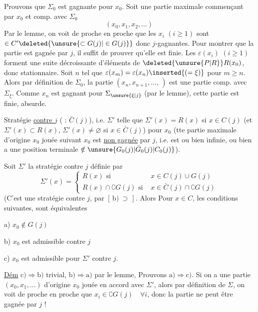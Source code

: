 Prouvons que $\Sigma_0$ est gagnante pour $x_0$. Soit une partie maximale commençant par $x_0$
et comp. avec $\Sigma_0$
\[
 (x_0,x_1,x_2,\ldots)
\]
Par le lemme, on voit de proche en proche  que   les $x_i$ $(i\geq1)$ sont $\in C'\deleted{\unsure{\subset G(j)|\in G(j)}}$ donc $j$-gagnantes. Pour montrer que la partie est gagnée par $j$, il suffit de prouver qu'elle est finie.   Les $\varepsilon(x_i)$ $(i\geq1)$ forment une suite décroissante d'éléments de $\deleted{\unsure{P|R}}R(x_0)$, donc stationnaire. Soit $n$ tel que $\varepsilon(x_m)=\varepsilon(x_n)\inserted{(=\xi)}$ pour $m\geq n$.  Alors par définition de $\Sigma_0$, la partie $(x_n,x_{n+1},\ldots,\,)$ est une partie comp. avec $\Sigma_\xi$. Comme $x_n$ est gagnant pour $\Sigma_{\unsure{\xi|j}}$ (par le lemme), cette partie est finie, absurde.

Stratégie \uline{contre $j$} (  : $\bar C(j)$), i.e. $\Sigma'$ telle que $\Sigma'(x)=R(x)$ si $x\in C(j)$ (et $\Sigma'(x)\subset R(x)$, $\Sigma'(x)\ne\varnothing$ si $x\in\bar C(j)$)  pour $x_0$ (tte partie maximale d'origine $x_0$ jouée suivant $x_0$ est \uline{non gagnée} par $j$, i.e. est ou bien infinie, ou bien a une position terminale $\notin \unsure{G_0(j)|\bar G_0(j)|C_0(j)}$).

\uline{}  Soit $\Sigma'$ la stratégie contre $j$ définie par
\[
 \Sigma'(x)=\begin{cases}
 R(x) \text{ si } & x\in C(j)\cup G(j)\\
 R(x)\cap\complement G(j) \text{ si } & x\in\bar C(j)\cap\complement G(j)
 \end{cases}
\]
(C'est une stratégie contre $j$, par $[\,\mathrm b)\ \supset\,]$. Alors Pour $x\in C$, les conditions suivantes, sont équivalentes

a) $x_0\notin G(j)$

b) $x_0$ est admissible contre $j$

c) $x_0$ est admissible pour $\Sigma'$ contre $j$.

\uline{Dém} $\mathrm c)\Longrightarrow\mathrm b)$ trivial, $\mathrm b)\Longrightarrow\mathrm a)$ par le lemme, Prouvons $\mathrm a)\Longrightarrow\mathrm c)$. Si on a une partie $(x_0,x_1,\ldots)$ d'origine $x_0$ jouée en accord avec $\Sigma'$, alors par définition de $\Sigma$, on voit de proche en proche que $x_i\in\complement G(j)\quad\forall i$, donc la partie ne peut être gagnée par $j$ !

